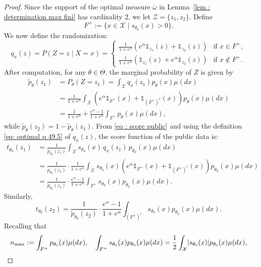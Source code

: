 \documentclass[a4paper, 11pt]{article}
\theoremstyle{definition}
\newcommand{\cX}{{\mathcal{X}}}
\newcommand{\cZ}{{\mathcal{Z}}}
\newcommand{\indi}[1]{\mathds{1}_{#1}}
\DeclarePairedDelimiter{\abs}{\lvert}{\rvert}
\begin{document}
{\begin{proof}
Since the support of the optimal measure $\overline{\omega}$ in Lemma~\ref{lem :  determination max fini} has cardinality $2$, we let $\cZ = \{z_1, z_2\}$. Define
\[
F^+ := \{x \in \cX \mid s_{\theta_0}(x) > 0\}.
\]
We now define the randomization:
\begin{equation}\label{eq: optimal q 49.5}
q_x(z) = P(Z = z \mid X = x) =
\begin{cases}
\displaystyle \frac{1}{1 + e^\alpha} \left( e^\alpha \indi{z_1}(z) + \indi{z_2}(z) \right) & \text{if } x \in F^+, \\
\displaystyle \frac{1}{1 + e^\alpha} \left( \indi{z_1}(z) + e^\alpha \indi{z_2}(z) \right) & \text{if } x \notin F^+.
\end{cases}
\end{equation}
After computation, for any $\theta \in \Theta$, the marginal probability of $Z$ is given by
\begin{align*}
\widetilde{p}_{\theta}(z_1) 
&= P_\theta(Z = z_1) = \int_\cX q_x(z_1) p_\theta(x) \mu(dx) \\
&= \frac{1}{1 + e^\alpha} \int_\mathcal{X} \left( e^\alpha \indi{F^+}(x) + \indi{(F^+)^c}(x) \right) p_\theta(x) \mu(dx) \\
&= \frac{1}{1 + e^\alpha} + \frac{e^\alpha - 1}{1 + e^\alpha} \int_{F^+} p_\theta(x) \mu(dx),
\end{align*}
while $\widetilde{p}_{\theta}(z_2) = 1 - \widetilde{p}_{\theta}(z_1)$. From \eqref{eq : score public} and using the definition \eqref{eq: optimal q 49.5} of $q_x(z)$, the score function of the public data is:
\begin{align*}
t_{\theta_0}(z_1) 
&= \frac{1}{\widetilde{p}_{\theta_0}(z_1)} \int_\cX s_{\theta_0}(x) \, q_x(z_1) \, p_{\theta_0}(x) \mu(dx) \\
&= \frac{1}{\widetilde{p}_{\theta_0}(z_1)} \cdot \frac{1}{1 + e^\alpha} \int_\cX s_{\theta_0}(x) \left( e^\alpha \indi{F^+}(x) + \indi{(F^+)^c}(x) \right) p_{\theta_0}(x) \mu(dx) \\
&= \frac{1}{\widetilde{p}_{\theta_0}(z_1)} \cdot \frac{e^\alpha - 1}{1 + e^\alpha} \int_{F^+} s_{\theta_0}(x) p_{\theta_0}(x) \mu(dx).
\end{align*}
Similarly,
\[
t_{\theta_0}(z_2) = \frac{1}{\widetilde{p}_{\theta_0}(z_2)} \cdot \frac{e^\alpha - 1}{1 + e^\alpha} \int_{(F^+)^c} s_{\theta_0}(x) p_{\theta_0}(x) \mu(dx).
\]
Recalling that 
\[
n_{\max} := \int_{F^+} p_{\theta_0}(x) \mu(dx), \quad 
\int_{F^+} s_{\theta_0}(x) p_{\theta_0}(x) \mu(dx) = \frac{1}{2} \int_\cX \abs{s_{\theta_0}(x)} p_{\theta_0}(x) \mu(dx),
\]
\end{proof}}
\end{document}
